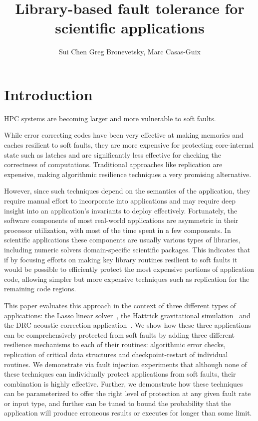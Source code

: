 \documentclass[prodmode,acmtecs]{acmsmall} %
\title{Library-based fault tolerance for scientific applications}
\author{Sui Chen
\affil{Louisiana State University}
Greg Bronevetsky, Marc Casas-Guix
\affil{Lawrence Livermore National Laboratory}}
\begin{document}
\section{Introduction}
\label{sec:intro}

HPC systems are becoming larger and more vulnerable to soft faults.

While error correcting codes have been very effective at making memories and caches resilient to soft faults, they are more expensive for protecting core-internal state such as latches and are significantly less effective for checking the correctness of computations.
Traditional approaches like replication are expensive, making algorithmic resilience techniques a very promising alternative.

However, since such techniques depend on the semantics of the application, they require manual effort to incorporate into applications and may require deep insight into an application's invariants to deploy effectively.
Fortunately, the software components of most real-world applications are asymmetric in their processor utilization, with most of the time spent in a few components.
In scientific applications these components are usually various types of libraries, including numeric solvers domain-specific scientific packages.
This indicates that if by focusing efforts on making key library routines resilient to soft faults it would be possible to efficiently protect the most expensive portions of application code, allowing simpler but more expensive techniques such as replication for the remaining code regions.

This paper evaluates this approach in the context of three different types of applications: the Lasso linear solver~\cite{}, the Hattrick gravitational simulation~\cite{} and the DRC acoustic correction application~\cite{}.
We show how these three applications can be comprehensively protected from soft faults by adding three different resilience mechanisms to each of their routines: algorithmic error checks, replication of critical data structures and checkpoint-restart of individual routines.
We demonstrate via fault injection experiments that although none of these techniques can individually protect applications from soft faults, their combination is highly effective.
Further, we demonstrate how these techniques can be parameterized to offer the right level of protection at any given fault rate or input type, and further can be tuned to bound the probability that the application will produce erroneous results or executes for longer than some limit.
\end{document}
